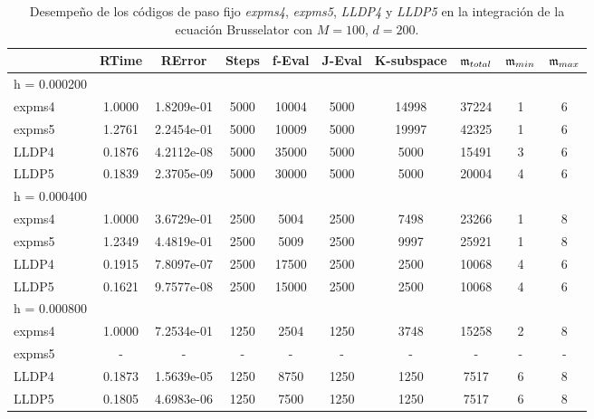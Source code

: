 \begin{table}[htb]
	\caption{Desempeño de los códigos de paso fijo \emph{expms4}, \emph{expms5}, \emph{LLDP4} y \emph{LLDP5} en la integración de la ecuación Brusselator con $M=100$, $d=200$.}
	\centering
	\begin{adjustbox}{width=0.95\columnwidth,center}
	\begin{tabular}{lccccccccc}
		\hline
		& RTime & RError & Steps & f-Eval & J-Eval & K-subspace & $\mathfrak{m}_{total}$ & $\mathfrak{m}_{min}$ & $\mathfrak{m}_{max}$ \\
		\hline
		h = 0.000200 &  &  &  &  &  &  &  &  &  \\
		expms4 & 1.0000 & 1.8209e-01 & 5000 & 10004 & 5000 & 14998 & 37224 & 1 & 6  \\
		expms5 & 1.2761 & 2.2454e-01 & 5000 & 10009 & 5000 & 19997 & 42325 & 1 & 6  \\
		LLDP4 & 0.1876 & 4.2112e-08 & 5000 & 35000 & 5000 & 5000 & 15491 & 3 & 6  \\
		LLDP5 & 0.1839 & 2.3705e-09 & 5000 & 30000 & 5000 & 5000 & 20004 & 4 & 6  \\
		\hline
		h = 0.000400 &  &  &  &  &  &  &  &  &  \\
		expms4 & 1.0000 & 3.6729e-01 & 2500 & 5004 & 2500 & 7498 & 23266 & 1 & 8  \\
		expms5 & 1.2349 & 4.4819e-01 & 2500 & 5009 & 2500 & 9997 & 25921 & 1 & 8  \\
		LLDP4 & 0.1915 & 7.8097e-07 & 2500 & 17500 & 2500 & 2500 & 10068 & 4 & 6  \\
		LLDP5 & 0.1621 & 9.7577e-08 & 2500 & 15000 & 2500 & 2500 & 10068 & 4 & 6  \\
		\hline
		h = 0.000800 &  &  &  &  &  &  &  &  &  \\
		expms4 & 1.0000 & 7.2534e-01 & 1250 & 2504 & 1250 & 3748 & 15258 & 2 & 8  \\
		expms5 & - & - & - & - & - & - &- & - & -\\
		LLDP4 & 0.1873 & 1.5639e-05 & 1250 & 8750 & 1250 & 1250 & 7517 & 6 & 8  \\
		LLDP5 & 0.1805 & 4.6983e-06 & 1250 & 7500 & 1250 & 1250 & 7517 & 6 & 8  \\
		\hline
	\end{tabular}
\end{adjustbox}
	\label{tab:num-exp-lldp-fix-step:brna}
\end{table}

